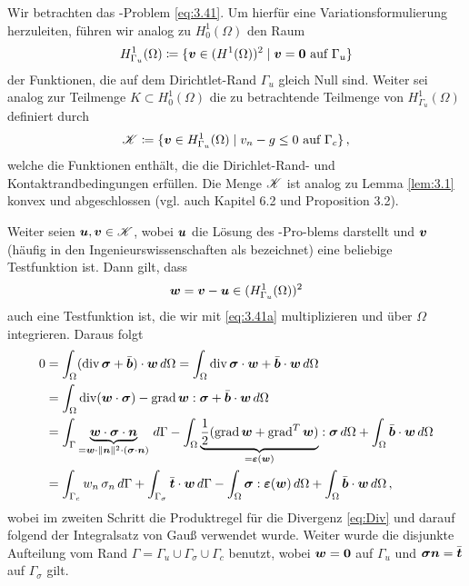 Wir betrachten das -Problem \eqref{eq:3.41}. Um hierfür eine Variationsformulierung herzuleiten, führen wir analog zu $H^1_0(\Omega)$ den Raum
\begin{align}\label{eq:3.43}
	H^1_{\Gamma_u}(\Omega) \coloneqq \{\boldsymbol v \in (H^1(\Omega))^2 \mid \boldsymbol v = \boldsymbol 0 \text{ auf } \Gamma_u\}
\end{align}
der Funktionen, die auf dem  Dirichtlet-Rand $\Gamma_u$ gleich Null sind. Weiter sei analog zur Teilmenge $K \subset H^1_0(\Omega)$ die zu betrachtende Teilmenge von $H^1_{\Gamma_u}(\Omega)$ definiert durch
\begin{align}\label{eq:3.44}
	\mathscr K \coloneqq \{\boldsymbol v \in H^1_{\Gamma_u}(\Omega) \mid v_n - g \le 0 \text{ auf } \Gamma_c\} \, ,
\end{align}
welche die Funktionen enthält, die die Dirichlet-Rand- und Kontaktrandbedingungen erfüllen. Die Menge $\mathscr K$ ist analog zu Lemma \ref{lem:3.1} konvex und abgeschlossen (vgl. auch \cite{KikOden} Kapitel 6.2 und \cite{CarWri} Proposition 3.2).


Weiter seien $\boldsymbol u, \boldsymbol v \in \mathscr K$, wobei $\boldsymbol u$ die Lösung des -Pro-blems darstellt und $\boldsymbol v$ (häufig in den Ingenieurswissenschaften als \textit{} bezeichnet) eine beliebige Testfunktion ist. Dann gilt, dass 
\[
	\boldsymbol w = \boldsymbol v - \boldsymbol u \in (H^1_{\Gamma_u}(\Omega))^2
\]
auch eine Testfunktion ist, die wir mit \eqref{eq:3.41a} multiplizieren und über $\Omega$ integrieren. Daraus folgt
\begin{align}\notag
	 0 & =  \int_\Omega (\operatorname{div} \boldsymbol\sigma + \bar{\boldsymbol b}) \cdot \boldsymbol w \, d \Omega = \int_\Omega \operatorname{div} \boldsymbol \sigma \cdot \boldsymbol w + \bar{\boldsymbol b} \cdot \boldsymbol w \, d\Omega \\
	 \notag
	& = \int_\Omega \operatorname{div}(\boldsymbol w \cdot \boldsymbol\sigma) - \operatorname{grad} \boldsymbol w : \boldsymbol \sigma + \bar{\boldsymbol b} \cdot \boldsymbol w \, d\Omega \\
	\notag
	& = \int_\Gamma \underbrace{\boldsymbol w \cdot \boldsymbol \sigma \cdot \boldsymbol n}_{=\boldsymbol w \cdot \lVert \boldsymbol n\rVert^2 \cdot (\boldsymbol \sigma \cdot \boldsymbol n)} \, d\Gamma - \int_\Omega \underbrace{\frac 1 2 (\operatorname{grad} \boldsymbol w + \operatorname{grad}^T \boldsymbol w)}_{= \boldsymbol {\varepsilon} (\boldsymbol w)} : \boldsymbol \sigma \, d\Omega + \int_\Omega \bar{\boldsymbol b} \cdot \boldsymbol w \, d \Omega \\
	\label{eq:3.43}
	& = \int_{\Gamma_c} w_n \, \sigma_n \, d \Gamma + \int_{\Gamma_\sigma} \bar{\boldsymbol t} \cdot \boldsymbol w \, d\Gamma-\int_\Omega \boldsymbol\sigma: \boldsymbol {\varepsilon}(\boldsymbol w) \, d\Omega + \int_\Omega \bar{\boldsymbol b} \cdot \boldsymbol w \, d\Omega \, ,
\end{align}
wobei im zweiten Schritt die Produktregel für die Divergenz \eqref{eq:Div} und darauf folgend der Integralsatz von Gauß verwendet wurde. Weiter wurde die disjunkte Aufteilung vom Rand $\Gamma = \Gamma_u \cup \Gamma_\sigma \cup \Gamma_c$ benutzt, wobei $\boldsymbol w = \boldsymbol 0$ auf $\Gamma_u$ und $\boldsymbol \sigma \boldsymbol n = \bar{\boldsymbol t}$ auf $\Gamma_\sigma$ gilt.


